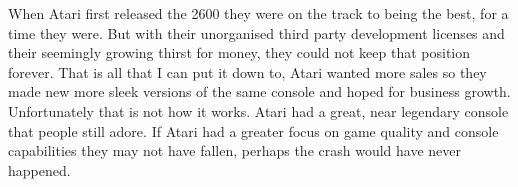 \documentclass{scrartcl}
\begin{document}
When Atari first released the 2600 they were on the track to being the best, for a time they were. But with their unorganised third party development licenses and their seemingly growing thirst for money, they could not keep that position forever. That is all that I can put it down to, Atari wanted more sales so they made new more sleek versions of the same console and hoped for business growth. Unfortunately that is not how it works. Atari had a great, near legendary console that people still adore. If Atari had a greater focus on game quality and console capabilities they may not have fallen, perhaps the crash would have never happened.

\newpage



\end{document}
